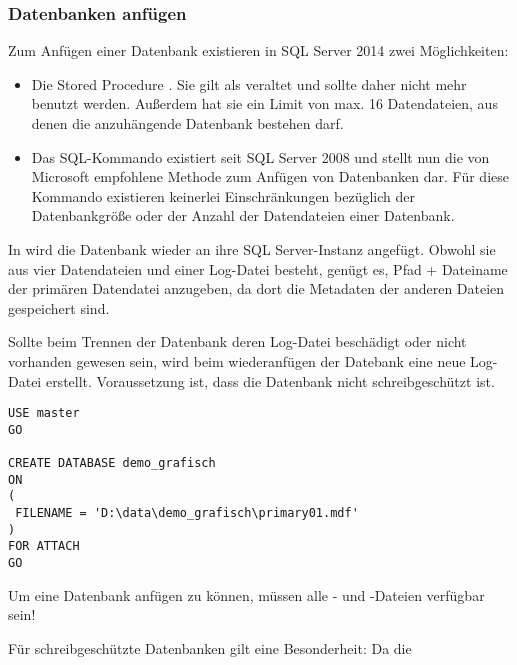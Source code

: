         \subsubsection{Datenbanken anfügen}
          Zum Anfügen einer Datenbank existieren in SQL Server 2014 zwei
          Möglichkeiten:
          \begin{itemize}
              \item Die Stored Procedure . Sie
              gilt als veraltet und sollte daher nicht mehr benutzt werden.
              Außerdem hat sie ein Limit von max. 16 Datendateien, aus denen die
              anzuhängende Datenbank bestehen darf.
              \item Das SQL-Kommando  existiert seit SQL Server 2008 und stellt nun die von
              Microsoft empfohlene Methode zum Anfügen von Datenbanken dar. Für
              diese Kommando existieren keinerlei Einschränkungen bezüglich der
              Datenbankgröße oder der Anzahl der Datendateien einer Datenbank.
          \end{itemize}
          In  wird die Datenbank
           wieder an ihre SQL Server-Instanz
          angefügt. Obwohl sie aus vier Datendateien und einer Log-Datei
          besteht, genügt es, Pfad + Dateiname der primären Datendatei
          anzugeben, da dort die Metadaten der anderen Dateien gespeichert sind.
          \begin{merke}
            Sollte beim Trennen der Datenbank deren Log-Datei beschädigt oder
            nicht vorhanden gewesen sein, wird beim wiederanfügen der Datebank
            eine neue Log-Datei erstellt. Voraussetzung ist, dass die Datenbank
            nicht schreibgeschützt ist.
          \end{merke}
\clearpage
          \begin{lstlisting}[language=ms_sql,caption={Anfügen der Datenbank
          demo\_grafisch},label=admin03_21]
USE master 
GO

CREATE DATABASE demo_grafisch
ON 
(
 FILENAME = 'D:\data\demo_grafisch\primary01.mdf'
)
FOR ATTACH
GO
          \end{lstlisting}
          \begin{merke}
            Um eine Datenbank anfügen zu können, müssen alle -
            und -Dateien verfügbar sein!
          \end{merke}
          Für schreibgeschützte Datenbanken gilt eine Besonderheit: Da die
